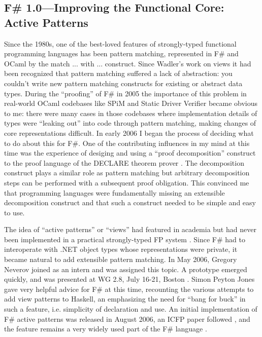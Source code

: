 \documentclass[acmsmall,screen]{acmart}
\begin{document}
\subsection*{F\# 1.0---Improving the Functional Core: Active Patterns}

Since the 1980s, one of the best-loved features of strongly-typed functional programming languages has been pattern matching,
represented in F\# and OCaml by the match ... with ... construct. Since Wadler’s work on views \citep{Wadler1987} it had been
recognized that pattern matching suffered a lack of abstraction: you couldn’t write new pattern matching constructs for existing
or abstract data types.  During the “proofing” of F\# in 2005 the importance of this problem in real-world OCaml codebases like
SPiM and Static Driver Verifier became obvious to me: there were many cases in those codebases where implementation details
of types were “leaking out” into code through pattern matching, making changes of core representations difficult.  In early 2006
I began the process of deciding what to do about this for F\#.  One of the contributing influences in my mind at this time was the
experience of desiging and using a ``proof decomposition'' construct to the proof language of the DECLARE theorem prover \citep{Syme99threetactic}. The
decomposition construct plays a similar role as pattern matching but arbitrary
decomposition steps can be performed with a subsequent proof obligation.  This convinced me that programming languages were fundamentally missing
an extensible decomposition construct and that such a construct needed to be simple and easy to use.

The idea of “active patterns” or “views” had featured in academia but had never been implemented in a practical strongly-typed
FP system \citep{Erwig1996}.  Since F\# had to interoperate with .NET object types whose representations were private, it became
natural to add extensible pattern matching. In May 2006, Gregory Neverov joined as an intern and was assigned this topic.  A prototype
emerged quickly, and was presented at WG 2.8, July 16-21, Boston \citep{RefWG28}.  Simon
Peyton Jones gave very helpful advice for F\# at this time, recounting the various attempts to add view patterns to Haskell, an emphasizing the
need for “bang for buck” in such a feature, i.e. simplicity of declaration and use. An initial implementation of F\# active patterns was released
in August 2006, an ICFP paper followed \citep{Syme2007}, and the feature remains a very widely used part of the
F\# language \citep{RefActivePatternsBlog}.
\end{document}

